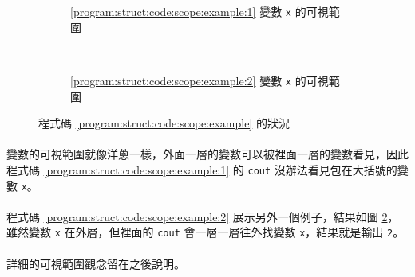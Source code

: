 \documentclass[12pt,a4paper,oneside]{article}
\begin{document}
\begin{CJK}{UTF8}{bkai}
\begin{figure}[h!]
\centering
\begin{subfigure}{.35\textwidth}
  \centering
  \caption{\ref{program:struct:code:scope:example:1} 變數 \lstinline!x! 的可視範圍}
  \label{program:struct:fig:scope:example:1}
\end{subfigure}
~
\begin{subfigure}{.35\textwidth}
  \centering
  \caption{\ref{program:struct:code:scope:example:2} 變數 \lstinline!x! 的可視範圍}
  \label{program:struct:fig:scope:example:2}
\end{subfigure}
\caption{程式碼 \ref{program:struct:code:scope:example} 的狀況}
\label{program:struct:fig:scope:example}
\end{figure}

\paragraph{}變數的可視範圍就像洋蔥一樣，外面一層的變數可以被裡面一層的變數看見，因此程式碼 \ref{program:struct:code:scope:example:1} 的 \lstinline!cout! 沒辦法看見包在大括號的變數 \lstinline!x!。

\paragraph{}程式碼 \ref{program:struct:code:scope:example:2} 展示另外一個例子，結果如圖 \ref{program:struct:fig:scope:example:2}，雖然變數 \lstinline!x! 在外層，但裡面的 \lstinline!cout! 會一層一層往外找變數 \lstinline!x!，結果就是輸出 \lstinline!2!。

\paragraph{}詳細的可視範圍觀念留在之後說明。


\end{CJK}
\end{document}
